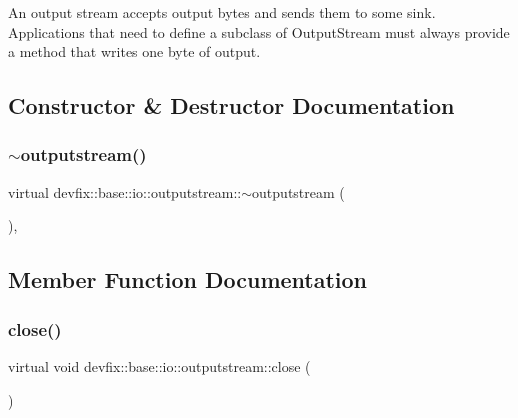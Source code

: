 An output stream accepts output bytes and sends them to some sink. Applications that need to define a subclass of Output\+Stream must always provide a method that writes one byte of output. 

\subsection{Constructor \& Destructor Documentation}
\mbox{\label{structdevfix_1_1base_1_1io_1_1outputstream_a9154a8859d44c7929c98fb83e03047e3}} 
\subsubsection{\texorpdfstring{$\sim$outputstream()}{~outputstream()}}
{\footnotesize\ttfamily virtual devfix\+::base\+::io\+::outputstream\+::$\sim$outputstream (\begin{DoxyParamCaption}{ }\end{DoxyParamCaption})\hspace{0.3cm}{\ttfamily [virtual]}, {\ttfamily [default]}}



\subsection{Member Function Documentation}
\mbox{\label{structdevfix_1_1base_1_1io_1_1outputstream_a060c2e7040e6bb831b8150f64bd8abf7}} 
\subsubsection{\texorpdfstring{close()}{close()}}
{\footnotesize\ttfamily virtual void devfix\+::base\+::io\+::outputstream\+::close (\begin{DoxyParamCaption}{ }\end{DoxyParamCaption})\hspace{0.3cm}{\ttfamily [pure virtual]}}



